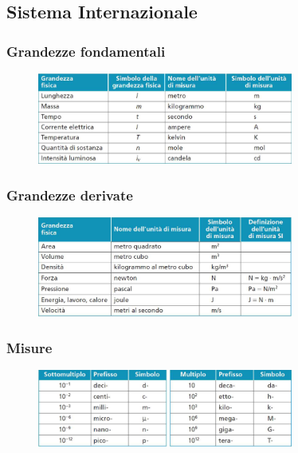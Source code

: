 \documentclass[a4paper]{article}
\begin{document}
\subsection{Sistema Internazionale}

\subsubsection{Grandezze fondamentali}

\begin{figure}[h]
    \centering
    \includegraphics[width=0.75\textwidth]{./si.png}
\end{figure}

\subsubsection{Grandezze derivate}

\begin{figure}[h]
    \centering
    \includegraphics[width=0.75\textwidth]{./grandezzederivate.png}
\end{figure}

\subsubsection{Misure}

\begin{figure}[h]
    \centering
    \includegraphics[width=0.75\textwidth]{./misure.png}
\end{figure}
\end{document}
